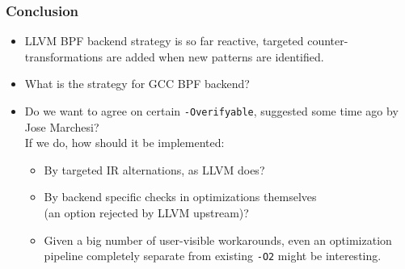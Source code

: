 \documentclass{beamer}
\newcommand{\code}[1]{\texttt{#1}}
\begin{document}
\begin{frame}
\frametitle{Conclusion}
\begin{itemize}
\item LLVM BPF backend strategy is so far reactive,
      targeted counter-transformations are added when new
      patterns are identified.
\item What is the strategy for GCC BPF backend?
\item Do we want to agree on certain \code{-Overifyable},
      suggested some time ago by Jose Marchesi? \\
      If we do, how should it be implemented:
      \begin{itemize}
      \item By targeted IR alternations, as LLVM does?
      \item By backend specific checks in optimizations
            themselves \\ (an option rejected by LLVM upstream)?
      \item Given a big number of user-visible workarounds,
            even an optimization pipeline completely separate
            from existing \code{-O2} might be interesting.
      \end{itemize}
\end{itemize}
\end{frame}
\end{document}
